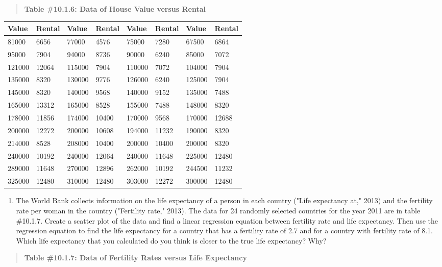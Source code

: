 \documentclass[]{book}
\providecommand{\tightlist}{%
  \setlength{\itemsep}{0pt}\setlength{\parskip}{0pt}}
\begin{document}
\begin{quote}
\textbf{Table \#10.1.6: Data of House Value versus Rental}
\end{quote}

\begin{longtable}[]{@{}llllllll@{}}
\toprule
Value & Rental & Value & Rental & Value & Rental & Value & Rental\tabularnewline
\midrule
\endhead
81000 & 6656 & 77000 & 4576 & 75000 & 7280 & 67500 & 6864\tabularnewline
95000 & 7904 & 94000 & 8736 & 90000 & 6240 & 85000 & 7072\tabularnewline
121000 & 12064 & 115000 & 7904 & 110000 & 7072 & 104000 & 7904\tabularnewline
135000 & 8320 & 130000 & 9776 & 126000 & 6240 & 125000 & 7904\tabularnewline
145000 & 8320 & 140000 & 9568 & 140000 & 9152 & 135000 & 7488\tabularnewline
165000 & 13312 & 165000 & 8528 & 155000 & 7488 & 148000 & 8320\tabularnewline
178000 & 11856 & 174000 & 10400 & 170000 & 9568 & 170000 & 12688\tabularnewline
200000 & 12272 & 200000 & 10608 & 194000 & 11232 & 190000 & 8320\tabularnewline
214000 & 8528 & 208000 & 10400 & 200000 & 10400 & 200000 & 8320\tabularnewline
240000 & 10192 & 240000 & 12064 & 240000 & 11648 & 225000 & 12480\tabularnewline
289000 & 11648 & 270000 & 12896 & 262000 & 10192 & 244500 & 11232\tabularnewline
325000 & 12480 & 310000 & 12480 & 303000 & 12272 & 300000 & 12480\tabularnewline
\bottomrule
\end{longtable}

\begin{enumerate}
\def\labelenumi{\arabic{enumi}.}
\setcounter{enumi}{2}
\tightlist
\item
  The World Bank collects information on the life expectancy of a
  person in each country ("Life expectancy at," 2013) and the
  fertility rate per woman in the country ("Fertility rate," 2013).
  The data for 24 randomly selected countries for the year 2011 are in
  table \#10.1.7. Create a scatter plot of the data and find a linear
  regression equation between fertility rate and life expectancy. Then
  use the regression equation to find the life expectancy for a
  country that has a fertility rate of 2.7 and for a country with
  fertility rate of 8.1. Which life expectancy that you calculated do
  you think is closer to the true life expectancy? Why?
\end{enumerate}

\begin{quote}
\textbf{Table \#10.1.7: Data of Fertility Rates versus Life Expectancy}
\end{quote}
\end{document}
